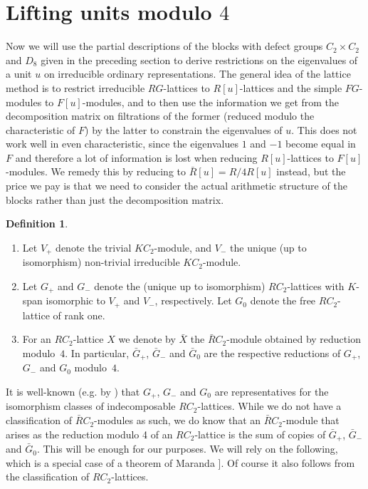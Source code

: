 \documentclass[11pt, a4paper]{amsart}
\theoremstyle{definition}
\theoremstyle{definition}
\newtheorem{definition}[theorem]{Definition}
\begin{document}
\section{Lifting units modulo $4$}

Now we will use the partial descriptions of the blocks with defect groups $C_2\times C_2$ and $D_8$ given in the preceding section to derive restrictions on the eigenvalues of a unit $u$ on irreducible ordinary representations. The general idea of the lattice method is to restrict irreducible $RG$-lattices to $R[u]$-lattices and the simple $FG$-modules to $F[u]$-modules, and to then use the information we get from the decomposition matrix on filtrations of the former (reduced modulo the characteristic of $F$) by the latter to constrain the eigenvalues of $u$.
This does not work well in even characteristic, since the eigenvalues $1$ and $-1$ become equal in $F$ and therefore a lot of information is lost when reducing  $R[u]$-lattices to $F[u]$-modules. We remedy this by reducing to $\bar R[u]=R/4R[u]$ instead, but the price we pay is that we need to consider the actual arithmetic structure of the blocks rather than just the decomposition matrix.

\begin{definition}
    \begin{enumerate}
    \item Let $V_+$ denote the trivial $KC_2$-module, and $V_-$ the unique (up to isomorphism) non-trivial irreducible $KC_2$-module.
    \item Let $G_+$ and $G_-$ denote the (unique up to isomorphism) $RC_2$-lattices with $K$-span isomorphic to $V_+$ and $V_-$, respectively. Let $G_0$ denote the free $RC_2$-lattice of rank one.
    \item For an $RC_2$-lattice $X$ we denote by $\bar X$ the $\bar RC_2$-module obtained by reduction modulo~$4$. In particular, $\bar G_+$, $\bar G_-$ and $\bar G_0$ are the respective reductions of $G_+$, $G_-$ and $G_0$ modulo~$4$.
    \end{enumerate}
\end{definition}

It is well-known (e.g. by \cite[Corollary 1 after Theorem 2.2]{Gudivok}) that $G_+$, $G_-$ and $G_0$ are representatives for the isomorphism classes of indecomposable $RC_2$-lattices. While we do not have a classification of $\bar R C_2$-modules as such, we do know that an $\bar R C_2$-module that arises as the reduction modulo 4 of an $RC_2$-lattice is the sum of copies of $\bar G_+$, $\bar G_-$ and $\bar G_0$. This will be enough for our purposes. We will rely on the following, which is a special case of a theorem of Maranda \cite[Theorem (30.14)]{CurtisReinerI}]. Of course it also follows from the classification of $RC_2$-lattices. 
\end{document}
